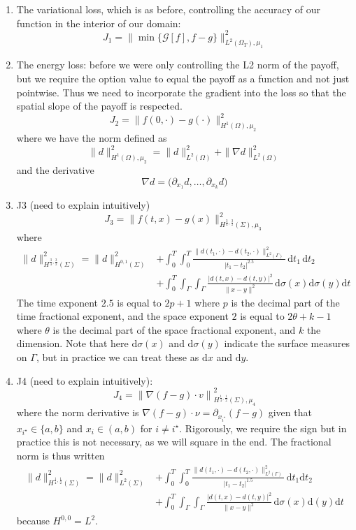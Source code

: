 \begin{enumerate}
    \item The variational loss, which is as before, controlling the accuracy of our function in the interior of our domain:
    $$J_1 = \|\min \{\mathcal G[f], f-g\}\|^2_{L^2(\Omega_T), \mu_1}$$
    \item The energy loss: before we were only controlling the L2 norm of the payoff, but we require the option value to equal the payoff as a function and not just pointwise. Thus we need to incorporate the gradient into the loss so that the spatial slope of the payoff is respected.
    $$J_2 = \|f(0, \cdot) - g(\cdot) \|^2_{H^1(\Omega), \mu_2}$$
    where we have the norm defined as
    $$\|d\|^2_{H^1(\Omega), \mu_2} = \|d\|^2_{L^2(\Omega)} + \|\nabla d\|^2_{L^2(\Omega)}$$
    and the derivative
    $$\nabla d = \big(\partial_{x_1}d, \dots, \partial_{x_k}d\big)$$
    \item J3 (need to explain intuitively)
    $$J_3 =\|f(t, x) - g( x)\|^2_{H^{\frac 34, \frac 32}(\Sigma), \mu_3}$$
    where
    \begin{align*}
        \|d\|^2_{H^{\frac 34, \frac 32}(\Sigma)} = \|d\|^2_{H^{0,1}(\Sigma)} &+ \int_0^T\int_0^T\frac{\|d(t_1, \cdot) - d(t_2, \cdot)\|^2_{L^2(\Gamma)}}{|t_1-t_2|^{2.5}}\,\mathrm dt_1\,\mathrm dt_2 \\ &+ \int_0^T\int_\Gamma\int_\Gamma \frac{|d(t, x) - d(t, y)|^2}{\|x-y\|^{2}}\,\mathrm d\sigma(x)\mathrm d\sigma(y) \mathrm dt
    \end{align*}
    The time exponent $2.5$ is equal to $2p+1$ where $p$ is the decimal part of the time fractional exponent, and the space exponent $2$ is equal to $2\theta + k - 1$ where $\theta$ is the decimal part of the space fractional exponent, and $k$ the dimension. Note that here $\mathrm d \sigma(x)$ and $\mathrm d \sigma(y)$ indicate the surface measures on $\Gamma$, but in practice we can treat these as $\mathrm dx$ and $\mathrm dy$.
    \item J4 (need to explain intuitively):
    $$J_4 =\left\|\nabla (f-g) \cdot v\right\|^2_{H^{\frac 14, \frac 12}(\Sigma), \mu_4}$$
    where the norm derivative is $\nabla(f-g)\cdot \nu = \partial_{x_{i^\star}}(f-g)$ given that $x_{i^\star} \in \{a, b\}$ and $x_{i} \in (a, b)$ for $i \ne i^\star$. Rigorously, we require the sign but in practice this is not necessary, as we will square in the end. The fractional norm is thus written
    \begin{align*}
        \|d\|^2_{H^{\frac 14, \frac 12}(\Sigma)} = \|d\|^2_{L^2(\Sigma)} &+ \int_0^T\int_0^T \frac{\|d(t_1, \cdot) - d(t_2, \cdot)\|^2_{L^2(\Gamma)}}{|t_1-t_2|^{1.5}}\,\mathrm dt_1\mathrm dt_2 \\ &+ \int_{0}^T\int_\Gamma\int_\Gamma \frac{|d(t, x) - d(t, y)|^2}{\|x-y\|^2}\,\mathrm d\sigma(x)\mathrm d(y)\mathrm dt
    \end{align*}
    because $H^{0, 0} = L^2$.
    
\end{enumerate}

